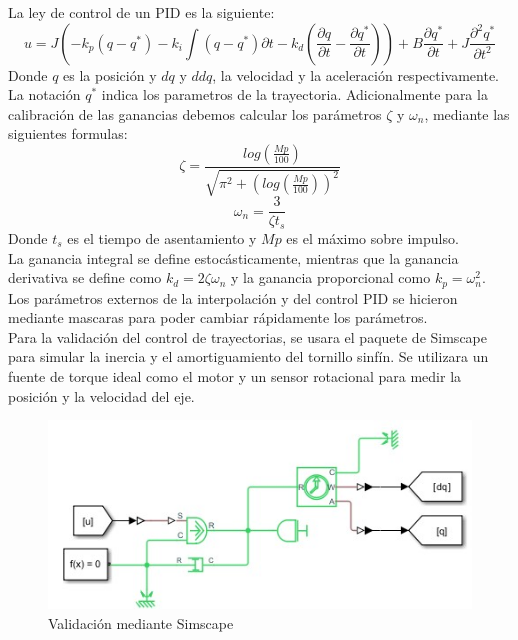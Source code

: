 La ley de control de un PID es la siguiente:
\begin{dmath}
    u = J\left(-k_p(q-q^{*})-k_i\int(q-q^{*})\partial t-k_d\left(\frac{\partial q}{\partial t}-\frac{\partial q^*}{\partial t}\right)\right)+B\frac{\partial q^*}{\partial t}+J\frac{\partial^2 q^*}{\partial t^2}
\end{dmath}
Donde $q$ es la posición y $dq$ y $ddq$, la velocidad y la aceleración respectivamente. La notación $q^*$ indica los parametros de la trayectoria.
Adicionalmente para la calibración de las ganancias debemos calcular los parámetros $\zeta$ y $\omega_n$, mediante las siguientes formulas:
\begin{dmath}
    \zeta = \frac{log\left(\frac{Mp}{100}\right)}{\sqrt{\pi^{2}+\left(log\left(\frac{Mp}{100}\right) \right)^{2}}}
\end{dmath}
\begin{dmath}
    \omega_n = \frac{3}{\zeta t_s}
\end{dmath}
Donde $t_s$ es el tiempo de asentamiento y $Mp$ es el máximo sobre impulso. \\
La ganancia integral se define estocásticamente, mientras que la ganancia derivativa se define como $k_d = 2\zeta\omega_n$ y la ganancia proporcional como $k_p = \omega_n^2$. \\
Los parámetros externos de la interpolación y del control PID se hicieron mediante mascaras para poder cambiar rápidamente los parámetros. \\
Para la validación del control de trayectorias, se usara el paquete de Simscape para simular la inercia y el amortiguamiento del tornillo sinfín. Se utilizara un fuente de torque ideal como el motor y un sensor rotacional para medir la posición y la velocidad del eje. 
\begin{figure}[!htb]
    \centering
    \includegraphics[width=1\textwidth]{imagenes/Simscape.jpg}
    \caption{\footnotesize Validación mediante Simscape}
    \label{fig:Simscape}
\end{figure}
